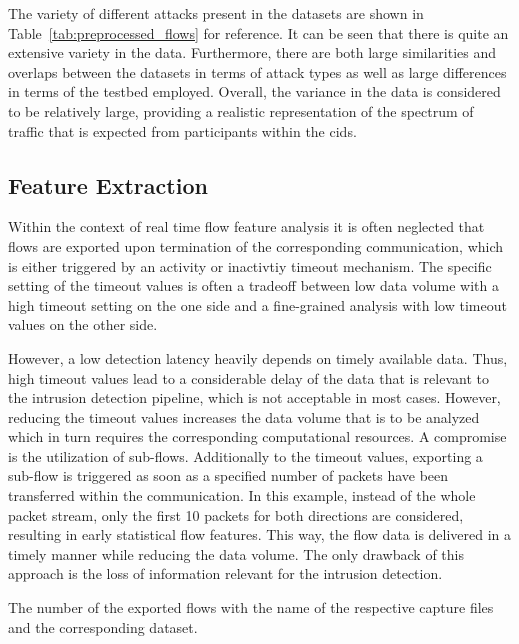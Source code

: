 \documentclass[../../main.tex]{subfiles}
\begin{document}
The variety of different attacks present in the datasets are shown in Table~\ref{tab:preprocessed_flows} for reference. It can be seen that there is quite an extensive variety in the data. Furthermore, there are both large similarities and overlaps between the datasets in terms of attack types as well as large differences in terms of the testbed employed. Overall, the variance in the data is considered to be relatively large, providing a realistic representation of the spectrum of traffic that is expected from participants within the \gls{cids}.

\subsection{Feature Extraction}\label{subsec:feature_extraction}

 Within the context of real time flow feature analysis it is often neglected that flows are exported upon termination of the corresponding communication, which is either triggered by an activity or inactivtiy timeout mechanism. The specific setting of the timeout values is often a tradeoff between low data volume with a high timeout setting on the one side and a fine-grained analysis with low timeout values on the other side. 
 
 However, a low detection latency heavily depends on timely available data. Thus, high timeout values lead to a considerable delay of the data that is relevant to the intrusion detection pipeline, which is not acceptable in most cases. However, reducing the timeout values increases the data volume that is to be analyzed which in turn requires the corresponding computational resources. A compromise is the utilization of sub-flows. Additionally to the timeout values, exporting a sub-flow is triggered as soon as a specified number of packets have been transferred within the communication. In this example, instead of the whole packet stream, only the first 10 packets for both directions are considered, resulting in early statistical flow features. This way, the flow data is delivered in a timely manner while reducing the data volume. The only drawback of this approach is the loss of information relevant for the intrusion detection. 

\begin{table}[t]
    \centering
    \footnotesize
    \centering
    \setlength{\extrarowheight}{0pt}
    \addtolength{\extrarowheight}{\aboverulesep}
    \addtolength{\extrarowheight}{\belowrulesep}
    \setlength{\aboverulesep}{0pt}
    \setlength{\belowrulesep}{0pt}
    \setlength{\extrarowheight}{.1em}
    
    \caption[Number of exported flows]{The number of the exported flows with the name of the respective capture files and the corresponding dataset.}
    \label{tab:num_exported_flows}
\end{table}
\end{document}
